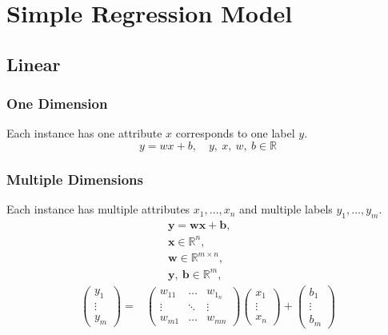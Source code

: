 \documentclass[../main.tex]{subfiles}
\begin{document}
    \section{Simple Regression Model}
        \subsection{Linear}
            \subsubsection{One Dimension}
                Each instance has one attribute $x$ corresponds to one label $y$. 
                \[
                    y=wx+b,\quad y,~x,~w,~b\in\mathbb{R}
                \]
            \subsubsection{Multiple Dimensions}
                Each instance has multiple attributes $x_1,\dots,x_n$ and multiple labels $y_1,\dots,y_m$.
                \begin{align*}
                    &\qquad\boldsymbol{y}=\boldsymbol{wx}+\boldsymbol{b},\\
                    &\qquad\boldsymbol{x}\in\mathbb{R}^n, \\
                    &\qquad\boldsymbol{w}\in\mathbb{R}^{m\times n},\\
                    &\qquad\boldsymbol{y},~\boldsymbol{b}\in\mathbb{R}^m,\\
                    \begin{pmatrix}
                        y_1\\
                        \vdots\\
                        y_m
                    \end{pmatrix}=&\begin{pmatrix}
                        w_{11} & \dots & w_{1_n}\\
                        \vdots & \ddots & \vdots\\
                        w_{m1} & \dots & w_{mn}
                    \end{pmatrix}\begin{pmatrix}
                        x_1\\
                        \vdots\\
                        x_n
                    \end{pmatrix}+\begin{pmatrix}
                        b_1\\
                        \vdots\\
                        b_m
                    \end{pmatrix}
                \end{align*}
\end{document}
